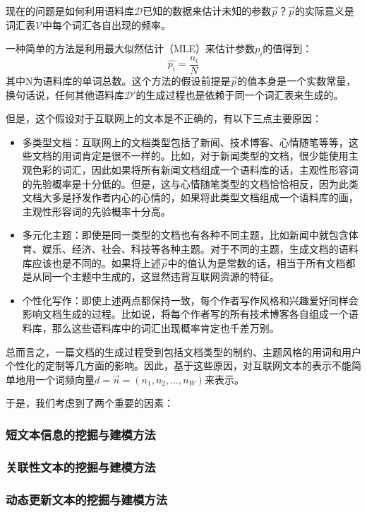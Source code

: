 现在的问题是如何利用语料库$\mathcal{D}$已知的数据来估计未知的参数$\vec{p}$？$\vec{p}$的实际意义是词汇表$\mathcal{V}$中每个词汇各自出现的频率。

一种简单的方法是利用最大似然估计（MLE）来估计参数$p_i$的值得到：
\begin{equation}
  \widehat{p_i}=\frac{n_i}{N}
\end{equation}
其中N为语料库的单词总数。这个方法的假设前提是$\vec{p}$的值本身是一个实数常量，换句话说，任何其他语料库$\mathcal{D}'$的生成过程也是依赖于同一个词汇表来生成的。

但是，这个假设对于互联网上的文本是不正确的，有以下三点主要原因：
\begin{itemize}
\item 多类型文档：互联网上的文档类型包括了新闻、技术博客、心情随笔等等，这些文档的用词肯定是很不一样的。比如，对于新闻类型的文档，很少能使用主观色彩的词汇，因此如果将所有新闻文档组成一个语料库的话，主观性形容词的先验概率是十分低的。但是，这与心情随笔类型的文档恰恰相反，因为此类文档大多是抒发作者内心的心情的，如果将此类型文档组成一个语料库的画，主观性形容词的先验概率十分高。
\item 多元化主题：即使是同一类型的文档也有各种不同主题，比如新闻中就包含体育、娱乐、经济、社会、科技等各种主题。对于不同的主题，生成文档的语料库应该也是不同的。如果将上述$\vec{p}$中的值认为是常数的话，相当于所有文档都是从同一个主题中生成的，这显然违背互联网资源的特征。
\item 个性化写作：即使上述两点都保持一致，每个作者写作风格和兴趣爱好同样会影响文档生成的过程。比如说，将每个作者写的所有技术博客各自组成一个语料库，那么这些语料库中的词汇出现概率肯定也千差万别。
\end{itemize}

总而言之，一篇文档的生成过程受到包括文档类型的制约、主题风格的用词和用户个性化的定制等几方面的影响。因此，基于这些原因，对互联网文本的表示不能简单地用一个词频向量$d=\vec{n}=(n_1,n_2,...,n_W)$来表示。

于是，我们考虑到了两个重要的因素：

\subsubsection{短文本信息的挖掘与建模方法}

\subsubsection{关联性文本的挖掘与建模方法}

\subsubsection{动态更新文本的挖掘与建模方法}

